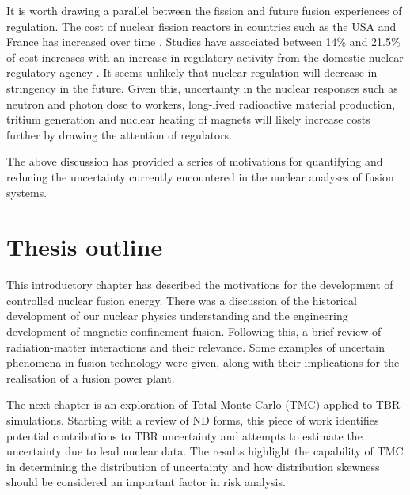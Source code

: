 It is worth drawing a parallel between the fission and future fusion experiences of regulation. The cost of nuclear fission reactors in countries such as the USA and France has increased over time \cite{Lovering2016}. Studies have associated between 14\% and 21.5\% of cost increases with an increase in regulatory activity from the domestic nuclear regulatory agency \cite{Cantor1988}. It seems unlikely that nuclear regulation will decrease in stringency in the future. Given this, uncertainty in the nuclear responses such as neutron and photon dose to workers, long-lived radioactive material production, tritium generation and nuclear heating of magnets will likely increase costs further by drawing the attention of regulators.


The above discussion has provided a series of motivations for quantifying and reducing the uncertainty currently encountered in the nuclear analyses of fusion systems.


\section{Thesis outline}
This introductory chapter has described the motivations for the development of controlled nuclear fusion energy. There was a discussion of the historical development of our nuclear physics understanding and the engineering development of magnetic confinement fusion. Following this, a brief review of radiation-matter interactions and their relevance. Some examples of uncertain phenomena in fusion technology were given, along with their implications for the realisation of a fusion power plant. 

The next chapter is an exploration of Total Monte Carlo (TMC)  applied to TBR simulations. Starting with a review of ND forms, this piece of work identifies potential contributions to TBR uncertainty and attempts to estimate the uncertainty due to lead nuclear data. The results highlight the capability of TMC in determining the distribution of uncertainty and how distribution skewness should be considered an important factor in risk analysis.

